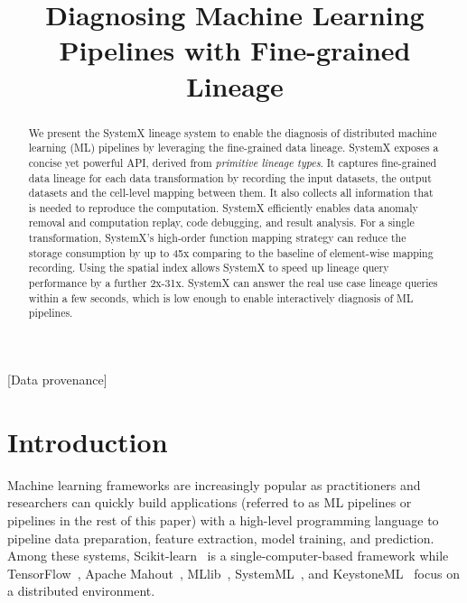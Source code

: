 \documentclass{sig-alternate}
\begin{document}
\title{Diagnosing Machine Learning Pipelines with Fine-grained Lineage}


\maketitle

\begin{abstract}
We present the SystemX lineage system to enable the diagnosis of distributed machine learning (ML) pipelines by leveraging the fine-grained
data lineage.  
SystemX exposes a concise yet powerful API, derived from \emph{primitive lineage types}. 
It captures fine-grained data lineage for each  data transformation by recording the input datasets, the output datasets and the cell-level mapping between them. 
It also collects all information that is needed to reproduce the computation.
SystemX efficiently enables data anomaly removal and computation replay, code debugging, and result analysis.
For a single transformation, SystemX's high-order function mapping strategy can reduce the storage consumption by up to 
45x comparing to the baseline of element-wise mapping recording.
Using the spatial index allows SystemX to speed up lineage query performance by a further 2x-31x. 
SystemX can answer the real use case lineage queries within a few seconds, 
which is low enough to enable interactively diagnosis of ML pipelines.
\end{abstract}

[Data provenance]

\section{Introduction}
Machine learning frameworks are increasingly popular as practitioners and researchers can quickly
build applications (referred to as ML pipelines or pipelines in the rest of this paper) with a high-level 
programming language to pipeline data preparation, feature extraction, model training, and prediction. 
Among these systems, Scikit-learn~\cite{pedregosa2011scikit}
is a single-computer-based framework while TensorFlow~\cite{tensorflow15}, Apache Mahout~\cite{owen2011mahout}, MLlib~\cite{meng2015mllib}, 
SystemML~\cite{ghoting11systemml}, and KeystoneML~\cite{sparks15} focus on a distributed environment.
\end{document}
